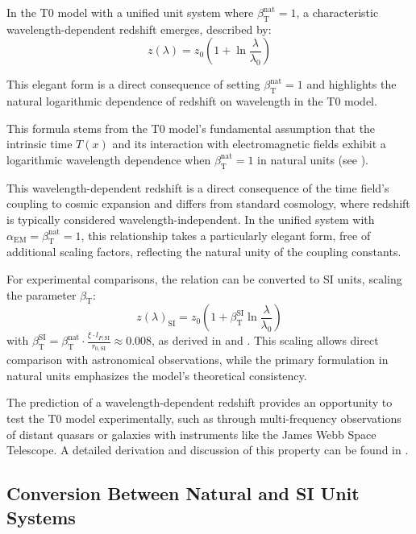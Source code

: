 \documentclass[12pt,a4paper]{article}
\newcommand{\Tfield}{T(x)}
\newcommand{\alphaEM}{\alpha_{\text{EM}}}
\newcommand{\betaT}{\beta_{\text{T}}}
\begin{document}
	In the T0 model with a unified unit system where \(\betaT^{\text{nat}} = 1\), a characteristic wavelength-dependent redshift emerges, described by:
	\begin{equation}
		z(\lambda) = z_0 \left(1 + \ln \frac{\lambda}{\lambda_0}\right)
	\end{equation}
	
	This elegant form is a direct consequence of setting \(\betaT^{\text{nat}} = 1\) and highlights the natural logarithmic dependence of redshift on wavelength in the T0 model.
	
	This formula stems from the T0 model's fundamental assumption that the intrinsic time \(\Tfield\) and its interaction with electromagnetic fields exhibit a logarithmic wavelength dependence when \(\betaT^{\text{nat}} = 1\) in natural units (see \cite{pascher_temp_2025}).
	
	This wavelength-dependent redshift is a direct consequence of the time field's coupling to cosmic expansion and differs from standard cosmology, where redshift is typically considered wavelength-independent. In the unified system with \(\alphaEM = \betaT^{\text{nat}} = 1\), this relationship takes a particularly elegant form, free of additional scaling factors, reflecting the natural unity of the coupling constants.
	
	For experimental comparisons, the relation can be converted to SI units, scaling the parameter \(\betaT\):
	\begin{equation}
		z(\lambda)_{\text{SI}} = z_0 \left(1 + \betaT^{\text{SI}} \ln \frac{\lambda}{\lambda_0}\right)
	\end{equation}
	with \(\betaT^{\text{SI}} = \betaT^{\text{nat}} \cdot \frac{\xi \cdot l_{P,\text{SI}}}{r_{0,\text{SI}}} \approx 0.008\), as derived in \cite{pascher_emergente_gravitation_2025} and \cite{pascher_params_2025}. This scaling allows direct comparison with astronomical observations, while the primary formulation in natural units emphasizes the model's theoretical consistency.
	
	The prediction of a wavelength-dependent redshift provides an opportunity to test the T0 model experimentally, such as through multi-frequency observations of distant quasars or galaxies with instruments like the James Webb Space Telescope. A detailed derivation and discussion of this property can be found in \cite{pascher_messdifferenzen_2025}.
	
	\subsection{Conversion Between Natural and SI Unit Systems}
	\label{subsec:conversion}
	
\end{document}
